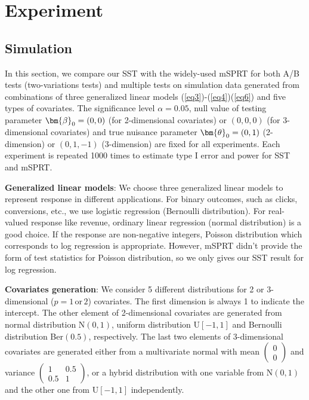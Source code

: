 \documentclass[letterpaper]{article}
\newcommand{\V}[1]{{\bm{\mathbf{\MakeLowercase{#1}}}}} %
\begin{document}
\section{Experiment}
\subsection{Simulation}
In this section, we compare our SST with the widely-used mSPRT for both A/B tests (two-variations tests) and multiple tests on simulation data generated from combinations of three generalized linear models (\ref{eq3})-(\ref{eq4})(\ref{eq6}) and five types of covariates. The significance level $\alpha=0.05$, null value of testing parameter $\V{\beta}_0=(0,0)$ (for 2-dimensional covariates) or $(0,0,0)$ (for 3-dimensional covariates) and true nuisance parameter $\V{\theta}_0=(0,1)$ (2-dimension) or $(0,1,-1)$ (3-dimension) are fixed for all experiments. Each experiment is repeated 1000 times to estimate type I error and power for SST and mSPRT.

\textbf{Generalized linear models}: We choose three generalized linear models to represent response in different applications. For binary outcomes, such as clicks, conversions, etc., we use logistic regression (Bernoulli distribution). For real-valued response like revenue, ordinary linear regression (normal distribution) is a good choice. If the response are non-negative integers, Poisson distribution which corresponds to log regression is appropriate. However, mSPRT didn't provide the form of test statistics for Poisson distribution, so we only gives our SST result for log regression.

\textbf{Covariates generation}: We consider 5 different distributions for 2 or 3-dimensional ($p=1 \,\text{or}\, 2$) covariates. The first dimension is always 1 to indicate the intercept. The other element of 2-dimensional covariates are generated from normal distribution N$(0,1)$, uniform distribution U$[-1,1]$ and Bernoulli distribution Ber$(0.5)$, respectively. The last two elements of 3-dimensional covariates are generated either from a multivariate normal with mean $(\begin{smallmatrix}
0\\0
\end{smallmatrix})$ and variance $(\begin{smallmatrix}
1 & 0.5\\0.5 & 1
\end{smallmatrix})$, or a hybrid distribution with one variable from N$(0,1)$ and the other one from U$[-1,1]$ independently.
\end{document}
